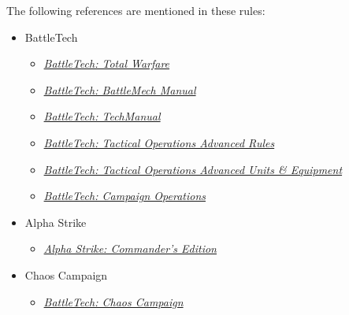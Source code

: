 The following references are mentioned in these rules:

\begin{itemize}

  \item BattleTech

  \begin{itemize}

    \item \emph{\href{https://store.catalystgamelabs.com/products/battletech-total-warfare-pdf}{BattleTech: Total Warfare}}

    \item \emph{\href{https://store.catalystgamelabs.com/products/battletech-battlemech-manual-book-pdf-combo}{BattleTech: BattleMech Manual}}

    \item \emph{\href{https://store.catalystgamelabs.com/products/battletech-techmanual-book-pdf}{BattleTech: TechManual}}

    \item \emph{\href{https://store.catalystgamelabs.com/products/battletech-tactical-operations-advanced-rules}{BattleTech: Tactical Operations Advanced Rules}}

    \item \emph{\href{https://store.catalystgamelabs.com/products/battletech-tactical-operations-advanced-units-equipement}{BattleTech: Tactical Operations Advanced Units \& Equipment}}

    \item \emph{\href{https://store.catalystgamelabs.com/products/battletech-campaign-operations-pdf}{BattleTech: Campaign Operations}}

  \end{itemize}

  \item Alpha Strike

  \begin{itemize}

    \item \emph{\href{https://store.catalystgamelabs.com/products/battletech-alpha-strike-commanders-edition}{Alpha Strike: Commander's Edition}}

  \end{itemize}

  \item Chaos Campaign

  \begin{itemize}

    \item \emph{\href{https://battletech.com/wp-content/uploads/sites/6/2025/07/CAT35600_ChaosCampaign_Rulebook.pdf}{BattleTech: Chaos Campaign}}


\end{itemize}
\end{itemize}
